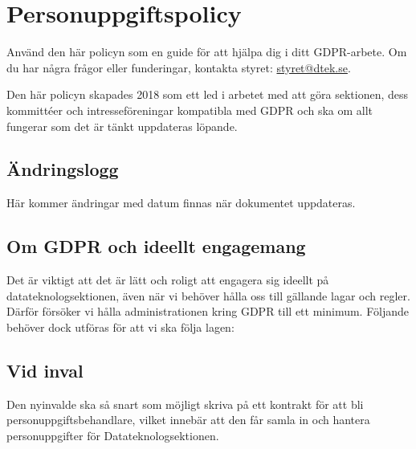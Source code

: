 



% 


\section{Personuppgiftspolicy}

Använd den här policyn som en guide för att hjälpa dig i ditt GDPR-arbete. Om du har några frågor eller funderingar, kontakta styret: \href{mailto:styret@dtek.se}{styret@dtek.se}.

Den här policyn skapades 2018 som ett led i arbetet med att göra sektionen, dess kommittéer och intresseföreningar kompatibla med GDPR och ska om allt fungerar som det är tänkt uppdateras löpande.


\subsection{Ändringslogg}

Här kommer ändringar med datum finnas när dokumentet uppdateras.

\subsection{Om GDPR och ideellt engagemang}

Det är viktigt att det är lätt och roligt att engagera sig ideellt på datateknologsektionen, även när vi behöver hålla oss till gällande lagar och regler. Därför försöker vi hålla administrationen kring GDPR till ett minimum. Följande behöver dock utföras för att vi ska följa lagen:

\subsection{Vid inval}

Den nyinvalde ska så snart som möjligt skriva på ett kontrakt för att bli personuppgiftsbehandlare, vilket innebär att den får samla in och hantera personuppgifter för Datateknologsektionen.

